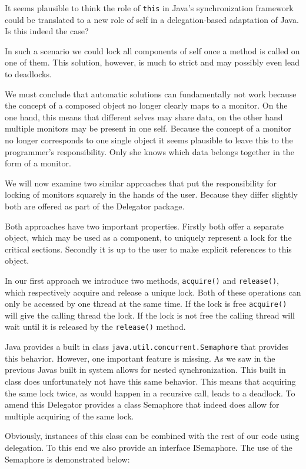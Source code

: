 \documentclass[a4paper,12pt]{book}
\begin{document}
It seems plausible to think the role of \verb|this| in Java's synchronization framework could be translated to a new role of self in a delegation-based adaptation of Java. Is this indeed the case? 

In such a scenario we could lock all components of self once a method is called on one of them. This solution, however, is much to strict and may possibly even lead to deadlocks. 

We must conclude that automatic solutions can fundamentally not work because the concept of a composed object no longer clearly maps to a monitor. On the one hand, this means that different selves may share data, on the other hand multiple monitors may be present in one self. Because the concept of a monitor no longer corresponds to one single object it seems plausible to leave this to the programmer's responsibility. Only she knows which data belongs together in the form of a monitor. 

We will now examine two similar approaches that put the responsibility for locking of monitors squarely in the hands of the user. Because they differ slightly both are offered as part of the Delegator package.

Both approaches have two important properties. Firstly both offer a separate object, which may be used as a component, to uniquely represent a lock for the critical sections. Secondly it is up to the user to make explicit references to this object.

In our first approach we introduce two methods, \verb|acquire()| and \verb|release()|, which respectively acquire and release a unique lock. Both of these operations can only be accessed by one thread at the same time. If the lock is free \verb|acquire()| will give the calling thread the lock. If the lock is not free the calling thread will wait until it is released by the \verb|release()| method.

Java provides a built in class \verb|java.util.concurrent.Semaphore| that provides this behavior. However, one important feature is missing. As we saw in the previous Javas built in system allows for nested synchronization. This built in class does unfortunately not have this same behavior. This means that acquiring the same lock twice, as would happen in a recursive call, leads to a deadlock. To amend this Delegator provides a class Semaphore that indeed does allow for multiple acquiring of the same lock.

Obviously, instances of this class can be combined with the rest of our code using delegation. To this end we also provide an interface ISemaphore. The use of the Semaphore is demonstrated below:
\end{document}
